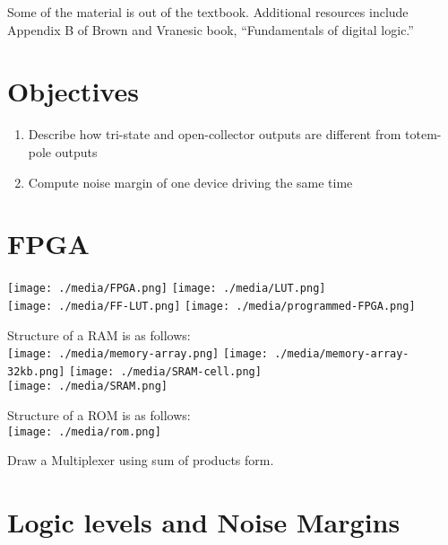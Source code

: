 Some of the material is out of the textbook. Additional resources include
Appendix B of Brown and Vranesic book, ``Fundamentals of digital logic.''

\section{Objectives}
\begin{enumerate}
\item Describe how tri-state and open-collector outputs are different from totem-pole outputs
\item Compute noise margin of one device driving the same time
\end{enumerate}

\section{FPGA~\cite[Section~B.6.5]{stephen2022fundamentals}}
\texttt{[image: ./media/FPGA.png]}
\texttt{[image: ./media/LUT.png]}\\

\texttt{[image: ./media/FF-LUT.png]}
\texttt{[image: ./media/programmed-FPGA.png]}


\begin{definition} Structure of a RAM is as follows:\\
  \texttt{[image: ./media/memory-array.png]}
  \texttt{[image: ./media/memory-array-32kb.png]}
  \texttt{[image: ./media/SRAM-cell.png]}\\
  \texttt{[image: ./media/SRAM.png]}
\end{definition}

\begin{definition} Structure of a ROM is as follows:\\
  \texttt{[image: ./media/rom.png]}
\end{definition}

\begin{example}
Draw a Multiplexer using sum of products form.
\end{example}
\vspace{10em}


\section{Logic levels and Noise Margins}

